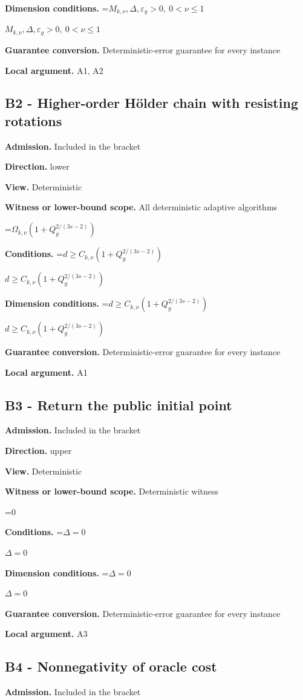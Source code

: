 \documentclass[10pt,a4paper]{article}
\newcommand{\AtlasMath}[1]{\par\begingroup\centering\setbox0=\hbox{$\displaystyle #1$}\ifdim\wd0>1.4\linewidth\typeout{ATLAS WIDE FORMULA: \the\wd0}\fi\ifdim\wd0>\linewidth\resizebox{\linewidth}{!}{\box0}\else\box0\fi\par\endgroup}
\newcommand{\AtlasInlineMath}[1]{\begingroup\setbox0=\hbox{$#1$}\ifdim\wd0>.4\linewidth\endgroup\AtlasMath{#1}\else\endgroup$#1$\fi}
\begin{document}
\textbf{Dimension conditions.} \AtlasInlineMath{M_{k,\nu},\Delta,\varepsilon_g>0,\ 0<\nu\le1}

\textbf{Guarantee conversion.} Deterministic-error guarantee for every instance

\textbf{Local argument.} A1, A2

\subsection{B2 - Higher-order Hölder chain with resisting rotations}
\textbf{Admission.} Included in the bracket

\textbf{Direction.} lower

\textbf{View.} Deterministic

\textbf{Witness or lower-bound scope.} All deterministic adaptive algorithms

\AtlasMath{\Omega_{k,\nu}(1+Q_g^{2/(3s-2)})}
\textbf{Conditions.} \AtlasInlineMath{d\ge C_{k,\nu}(1+Q_g^{2/(3s-2)})}

\textbf{Dimension conditions.} \AtlasInlineMath{d\ge C_{k,\nu}(1+Q_g^{2/(3s-2)})}

\textbf{Guarantee conversion.} Deterministic-error guarantee for every instance

\textbf{Local argument.} A1

\subsection{B3 - Return the public initial point}
\textbf{Admission.} Included in the bracket

\textbf{Direction.} upper

\textbf{View.} Deterministic

\textbf{Witness or lower-bound scope.} Deterministic witness

\AtlasMath{0}
\textbf{Conditions.} \AtlasInlineMath{\Delta=0}

\textbf{Dimension conditions.} \AtlasInlineMath{\Delta=0}

\textbf{Guarantee conversion.} Deterministic-error guarantee for every instance

\textbf{Local argument.} A3

\subsection{B4 - Nonnegativity of oracle cost}
\textbf{Admission.} Included in the bracket
\end{document}
